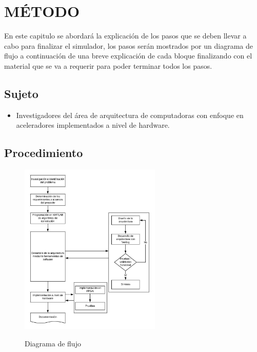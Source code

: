 \renewcommand\thechapter{\Roman{chapter}}
\chapter{MÉTODO} \label{ch:metodo} \thispagestyle{fancy}
\renewcommand\thechapter{\arabic{chapter}}
En este capitulo se abordará la explicación de los pasos que se deben llevar a cabo para finalizar el simulador, los pasos serán mostrados por un diagrama de flujo a continuación de una breve explicación de cada bloque finalizando con el material que se va a requerir para poder terminar todos los pasos.\\

\section{Sujeto}
\begin{itemize}
\item Investigadores del área de arquitectura de computadoras con enfoque en aceleradores implementados a nivel de hardware.
\end{itemize}

\section{Procedimiento}

\begin{figure}[!h]
\centering
\includegraphics[width=0.6\textwidth, height=0.6\textheight]{./figs/procedimiento}\\
\caption{Diagrama de flujo}
\label{diagramaflujo}
\end{figure}

